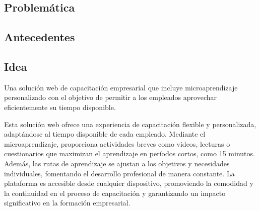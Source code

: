 






\subsection{Problemática}


\subsection{Antecedentes}


\subsection{Idea}
Una solución web de capacitación empresarial que incluye microaprendizaje personalizado con el objetivo de permitir
a los empleados aprovechar eficientemente su tiempo disponible.

Esta solución web ofrece una experiencia de capacitación flexible y personalizada,
adaptándose al tiempo disponible de cada empleado.
Mediante el microaprendizaje, proporciona actividades breves como videos,
lecturas o cuestionarios que maximizan el aprendizaje en períodos cortos,
como 15 minutos. Además, las rutas de aprendizaje se ajustan a los objetivos y necesidades individuales,
fomentando el desarrollo profesional de manera constante. La plataforma es accesible desde cualquier dispositivo,
promoviendo la comodidad y la continuidad en el proceso de capacitación y garantizando un impacto significativo en la
formación empresarial.

